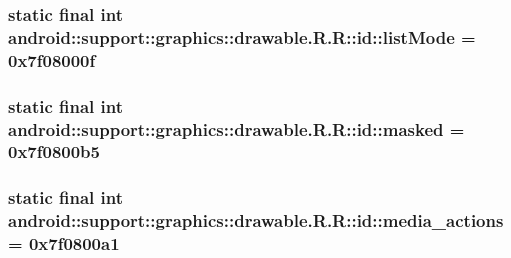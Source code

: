 \hypertarget{classandroid_1_1support_1_1graphics_1_1drawable_1_1_r_1_1id_655ab470a39f8fdd4bfc12563386c5cf}{
\subsubsection[{listMode}]{\setlength{\rightskip}{0pt plus 5cm}static final int android::support::graphics::drawable.R.R::id::listMode = 0x7f08000f}}
\label{classandroid_1_1support_1_1graphics_1_1drawable_1_1_r_1_1id_655ab470a39f8fdd4bfc12563386c5cf}


\hypertarget{classandroid_1_1support_1_1graphics_1_1drawable_1_1_r_1_1id_1bb1d2a10b89d3cc6a72bbbb7b764ebf}{
\subsubsection[{masked}]{\setlength{\rightskip}{0pt plus 5cm}static final int android::support::graphics::drawable.R.R::id::masked = 0x7f0800b5}}
\label{classandroid_1_1support_1_1graphics_1_1drawable_1_1_r_1_1id_1bb1d2a10b89d3cc6a72bbbb7b764ebf}


\hypertarget{classandroid_1_1support_1_1graphics_1_1drawable_1_1_r_1_1id_ba021c0e2a2d8cd39afd2cc7e592e7c2}{
\subsubsection[{media\_\-actions}]{\setlength{\rightskip}{0pt plus 5cm}static final int android::support::graphics::drawable.R.R::id::media\_\-actions = 0x7f0800a1}}
\label{classandroid_1_1support_1_1graphics_1_1drawable_1_1_r_1_1id_ba021c0e2a2d8cd39afd2cc7e592e7c2}


